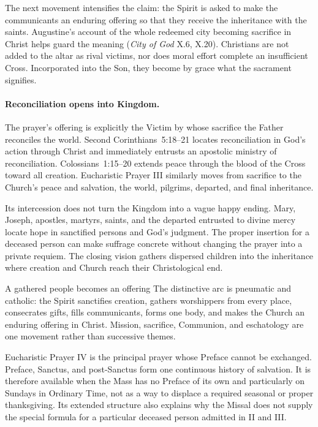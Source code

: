 The next movement intensifies the claim: the Spirit is asked to make the communicants an enduring offering so that they receive the inheritance with the saints. Augustine's account of the whole redeemed city becoming sacrifice in Christ helps guard the meaning (\emph{City of God} X.6, X.20). Christians are not added to the altar as rival victims, nor does moral effort complete an insufficient Cross. Incorporated into the Son, they become by grace what the sacrament signifies.

\paragraph{Reconciliation opens into Kingdom.}
The prayer's offering is explicitly the Victim by whose sacrifice the Father reconciles the world. Second Corinthians~5:18--21 locates reconciliation in God's action through Christ and immediately entrusts an apostolic ministry of reconciliation. Colossians~1:15--20 extends peace through the blood of the Cross toward all creation. Eucharistic Prayer III similarly moves from sacrifice to the Church's peace and salvation, the world, pilgrims, departed, and final inheritance.

Its intercession does not turn the Kingdom into a vague happy ending. Mary, Joseph, apostles, martyrs, saints, and the departed entrusted to divine mercy locate hope in sanctified persons and God's judgment. The proper insertion for a deceased person can make suffrage concrete without changing the prayer into a private requiem. The closing vision gathers dispersed children into the inheritance where creation and Church reach their Christological end.

\begin{massbox}{A gathered people becomes an offering}
The distinctive arc is pneumatic and catholic: the Spirit sanctifies creation, gathers worshippers from every place, consecrates gifts, fills communicants, forms one body, and makes the Church an enduring offering in Christ. Mission, sacrifice, Communion, and eschatology are one movement rather than successive themes.
\end{massbox}


Eucharistic Prayer IV is the principal prayer whose Preface cannot be exchanged. Preface, Sanctus, and post-Sanctus form one continuous history of salvation. It is therefore available when the Mass has no Preface of its own and particularly on Sundays in Ordinary Time, not as a way to displace a required seasonal or proper thanksgiving. Its extended structure also explains why the Missal does not supply the special formula for a particular deceased person admitted in II and III.


